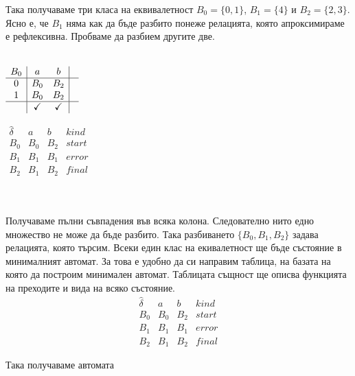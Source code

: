 \documentclass[12pt]{article}
\begin{document}
\par Така получаваме три класа на еквивалетност \(B_0 = \{0, 1\}\), \(B_1 = \{4\}\) и \(B_2 = \{2, 3\}\).
Ясно е, че \(B_1\) няма как да бъде разбито понеже релацията, която апроксимираме е рефлексивна.
Пробваме да разбием другите две.
\\
\vspace*{5mm}
\\
\begin{minipage}{.5\textwidth}
\centering
\(\begin{array}{c|cc|c}
B_0 & a & b   & \\ \hline
0 & B_0 & B_2 & \\
1 & B_0 & B_2 & \\ \hline
  & \checkmark & \checkmark & 
\end{array}\)
\end{minipage}
\begin{minipage}{.5\textwidth}
\centering
\(\begin{array}{c|cc|c}
\hat{\delta} & a & b & kind \\ \hline
B_0 & B_0 & B_2 & start \\
B_1 & B_1 & B_1 & error \\
B_2 & B_1 & B_2 & final
\end{array}\)
\end{minipage}
\\
\vspace*{5mm}
\\
Получаваме пълни съвпадения във всяка колона. Следователно нито едно множество не може да бъде разбито.
Така разбиването \(\{B_0, B_1, B_2\}\) задава релацията, която търсим. Всеки един клас на екивалетност ще бъде състояние в минималният автомат. За това е удобно да си направим таблица, на базата на която да построим минимален автомат. Таблицата същност ще описва функцията на преходите и вида на всяко състояние.
\[\begin{array}{c|cc|c}
\hat{\delta} & a & b & kind \\ \hline
B_0 & B_0 & B_2 & start \\
B_1 & B_1 & B_1 & error \\
B_2 & B_1 & B_2 & final
\end{array}\]

Така получаваме автомата
\begin{center}
\end{center}
\end{document}
